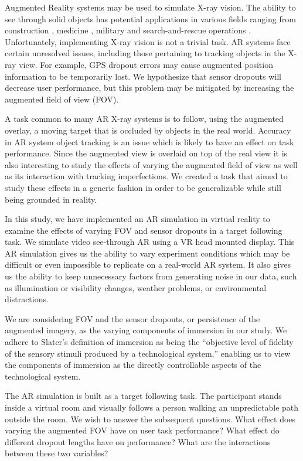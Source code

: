 \documentclass{acmsiggraph}                     %
\begin{document}
\copyrightspace

Augmented Reality systems may be used to simulate X-ray vision.  The ability to see through solid objects has potential applications in various fields ranging from construction \cite{Webster96augmentedreality}, medicine \cite{azuma95survey}, military \cite{Livingston02anaugmented} and search-and-rescue operations \cite{1528424}.  Unfortunately, implementing X-ray vision is not a trivial task.  AR systems face certain unresolved issues, including those pertaining to tracking objects in the X-ray view.  For example, GPS dropout errors \cite{4079263} may cause augmented position information to be temporarily lost.  We hypothesize that sensor dropouts will decrease user performance, but this problem may be mitigated by increasing the augmented field of view (FOV).

A task common to many AR X-ray systems is to follow, using the augmented overlay, a moving target that is occluded by objects in the real world.  Accuracy in AR system object tracking is an issue which is likely to have an effect on task performance.  Since the augmented view is overlaid on top of the real view it is also interesting to study the effects of varying the augmented field of view as well as its interaction with tracking imperfections.  We created a task that aimed to study these effects in a generic fashion in order to be generalizable while still being grounded in reality.

In this study, we have implemented an AR simulation in virtual reality to examine the effects of varying FOV and sensor dropouts in a target following task.  We simulate video see-through AR using a VR head mounted display.  This AR simulation gives us the ability to vary experiment conditions which may be difficult or even impossible to replicate on a real-world AR system.  It also gives us the ability to keep unnecessary factors from generating noise in our data, such as illumination or visibility changes, weather problems, or environmental distractions. 

We are considering FOV and the sensor dropouts, or persistence of the augmented imagery, as the varying components of immersion in our study.  We adhere to Slater's definition \cite{slater} of immersion as being the ``objective level of fidelity of the sensory stimuli produced by a technological system,''  enabling us to view the components of immersion as the directly controllable aspects of the technological system.

The AR simulation is built as a target following task.  The participant stands inside a virtual room and visually follows a person walking an unpredictable path outside the room.  We wish to answer the subsequent questions.  What effect does varying the augmented FOV have on user task performance?  What effect do different dropout lengths have on performance?  What are the interactions between these two variables?
\end{document}
